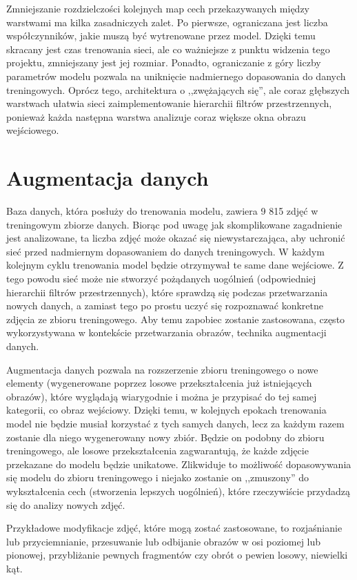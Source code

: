 Zmniejszanie rozdzielczości kolejnych map cech przekazywanych między warstwami ma kilka zasadniczych zalet. Po pierwsze, ograniczana jest liczba współczynników, jakie muszą być wytrenowane przez model. Dzięki temu skracany jest czas trenowania sieci, ale co ważniejsze z punktu widzenia tego projektu, zmniejszany jest jej rozmiar. Ponadto, ograniczanie z góry liczby parametrów modelu pozwala na uniknięcie nadmiernego dopasowania do danych treningowych. Oprócz tego, architektura o ,,zwężających się'', ale coraz głębszych warstwach ułatwia sieci zaimplementowanie hierarchii filtrów przestrzennych, ponieważ każda następna warstwa analizuje coraz większe okna obrazu wejściowego.


\section{Augmentacja danych}
Baza danych, która posłuży do trenowania modelu, zawiera 9 815 zdjęć w treningowym zbiorze danych.
Biorąc pod uwagę jak skomplikowane zagadnienie jest analizowane, ta liczba zdjęć może okazać się niewystarczająca, aby uchronić sieć przed nadmiernym dopasowaniem do danych treningowych. 
W każdym kolejnym cyklu trenowania model będzie otrzymywał te same dane wejściowe.
Z tego powodu sieć może nie stworzyć pożądanych uogólnień (odpowiedniej hierarchii filtrów przestrzennych), które sprawdzą się podczas przetwarzania nowych danych, a zamiast tego po prostu uczyć się rozpoznawać konkretne zdjęcia ze zbioru treningowego.
Aby temu zapobiec zostanie zastosowana, często wykorzystywana w kontekście przetwarzania obrazów, technika augmentacji danych.

Augmentacja danych pozwala na rozszerzenie zbioru treningowego o nowe elementy (wygenerowane poprzez losowe przekształcenia już istniejących obrazów), które wyglądają wiarygodnie i można je przypisać do tej samej kategorii, co obraz wejściowy. Dzięki temu, w kolejnych epokach trenowania model nie będzie musiał korzystać z tych samych danych, lecz za każdym razem zostanie dla niego wygenerowany nowy zbiór. Będzie on podobny do zbioru treningowego, ale losowe przekształcenia zagwarantują, że każde zdjęcie przekazane do modelu będzie unikatowe. Zlikwiduje to możliwość dopasowywania się modelu do zbioru treningowego i niejako zostanie on ,,zmuszony'' do wykształcenia cech (stworzenia lepszych uogólnień), które rzeczywiście przydadzą się do analizy nowych zdjęć.

Przykładowe modyfikacje zdjęć, które mogą zostać zastosowane, to rozjaśnianie lub przyciemnianie, przesuwanie lub odbijanie obrazów w osi poziomej lub pionowej, przybliżanie pewnych fragmentów czy obrót o pewien losowy, niewielki kąt.

